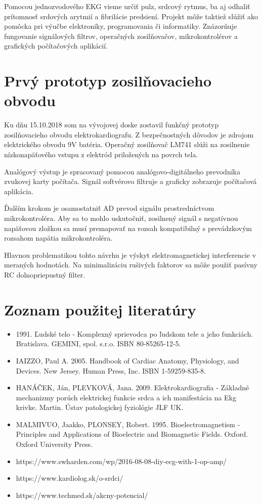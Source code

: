 \documentclass[titlepage]{article}
\begin{document}
Pomocou jednozvodového EKG vieme určiť pulz, srdcový rytmus, ba aj odhaliť prítomnosť srdových arytmií a fibrilácie predsiení. Projekt môže taktiež slúžiť ako pomôcka pri výučbe elektroniky, programovania či informatiky. Znázorňuje fungovanie signálových filtrov, operačných zosilňovačov, mikrokontrolérov a grafických počítačových aplikácií.

\newpage
\section*{Prvý prototyp zosilňovacieho obvodu}
Ku dňu 15.10.2018 som na vývojovej doske zostavil funkčný prototyp zosilňovacieho obvodu elektrokardiografu. Z bezpečnostných dôvodov je zdrojom elektrického obvodu 9V batéria. Operačný zosilňovač LM741 slúži na zosilnenie nízkonapäťového vstupu z elektród priložených na povrch tela. 

Analógový výstup je spracovaný pomocou analógovo-digitálneho prevodníka zvukovej karty počítača. Signál softvérovo filtruje a graficky zobrazuje počítačová aplikácia.

Ďalším krokom je osamostatniť AD prevod signálu prostredníctvom mikrokontroléra. Aby sa to mohlo uskutočniť, zosilnený signál s negatívnou napäťovou zložkou sa musí premapovať  na rozsah kompatibilný s prevádzkovým rozsahom napätia mikrokontroléra.

Hlavnou problematikou tohto návrhu je výskyt elektromagnetickej interferencie v meraných hodnotách. Na minimalizáciu rušivých faktorov sa môže použiť pasívny RC dolnopriepustný filter.

\newpage
\section*{Zoznam použitej literatúry}
\begin{itemize}
\item 1991. Ľudské telo - Komplexný sprievodca po ľudskom tele a jeho funkciách. Bratislava. GEMINI, spol. s.r.o. ISBN 80-85265-12-5.
\item IAIZZO, Paul A. 2005. Handbook of Cardiac Anatomy, Physiology, and Devices. New Jersey. Human Press, Inc. ISBN 1-59259-835-8.
\item HANÁČEK, Ján, PLEVKOVÁ, Jana. 2009. Elektrokardiografia - Základné mechanizmy porúch elektrickej funkcie srdca a ich manifestácia na Ekg krivke. Martin. Ústav patologickej fyziológie JLF UK.
\item MALMIVUO, Jaakko, PLONSEY, Robert. 1995. Bioelectromagnetism - Principles and Applications of Bioelectric and Biomagnetic Fields. Oxford. Oxford University Press.
\item https://www.swharden.com/wp/2016-08-08-diy-ecg-with-1-op-amp/
\item https://www.kardiolog.sk/o-srdci/
\item https://www.techmed.sk/akcny-potencial/

\end{itemize}
\end{document}
